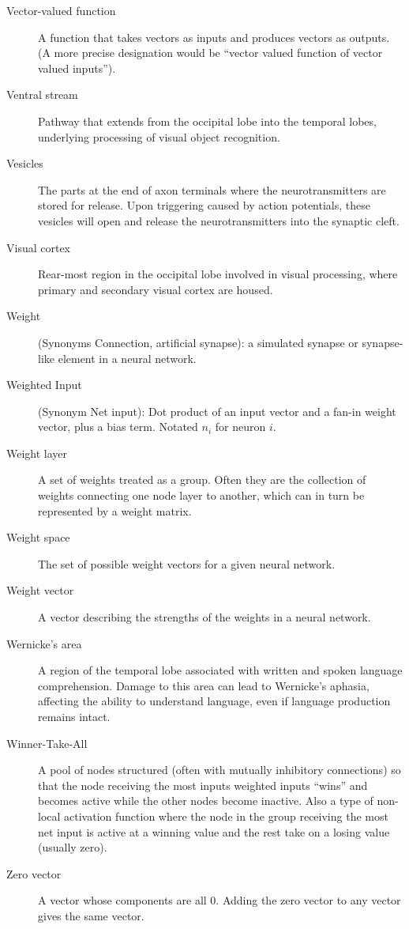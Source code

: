 \begin{description}
\item[Vector-valued function] A function that takes vectors as inputs and produces vectors as outputs. (A more precise designation would be ``vector valued function of vector valued inputs''). 

\item[Ventral stream] Pathway that extends from the occipital lobe into the temporal lobes, underlying processing of visual object recognition. 

\item[Vesicles] The parts at the end of axon terminals where the neurotransmitters are stored for release. Upon triggering caused by action potentials, these vesicles will open and release the neurotransmitters into the synaptic cleft.

\item[Visual cortex] Rear-most region in the occipital lobe involved in visual processing, where primary and secondary visual cortex are housed.

\item[Weight] (Synonyms Connection, artificial synapse): a simulated synapse or synapse-like element in a neural network. 

\item[Weighted Input] (Synonym Net input): Dot product of an input vector and a fan-in weight vector, plus a bias term. Notated $n_i$ for neuron $i$.

\item[Weight layer] A set of weights treated as a group. Often they are the collection of weights connecting one node layer to another, which can in turn be represented by a weight matrix. %

\item[Weight space] The set of possible weight vectors for a given neural network.

\item[Weight vector] A vector describing the strengths of the weights in a neural network.

\item[Wernicke's area] A region of the temporal lobe associated with written and spoken language comprehension. Damage to this area can lead to Wernicke's aphasia, affecting the ability to understand language, even if language production remains intact.

\item[Winner-Take-All] A pool of nodes structured (often with mutually inhibitory connections) so that the node receiving the most inputs weighted inputs ``wins'' and becomes active while the other nodes become inactive. Also a type of non-local activation function where the node in the group receiving the most net input is active at a winning value and the rest take on a losing value (usually zero). 

\item[Zero vector] A vector whose components are all $0$. Adding the zero vector to any vector gives the same vector.

\end{description}